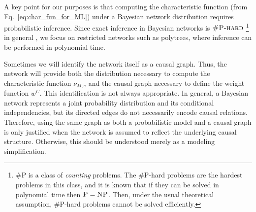 A key point for our purposes is that computing the characteristic function (from Eq.~\eqref{eq:char_fun_for_ML}) under a Bayesian network distribution requires probabilistic inference. Since exact inference in Bayesian networks is $\textsc{\#P-hard}$ \footnote{\#\textsc{P} is a class of \textit{counting} problems. The \#\textsc{P}-hard problems are the hardest problems in this class, and it is known that if they can be solved in polynomial time then $\textsc{P} = \textsc{NP}$. Then, under the usual theoretical assumption, \#\textsc{P}-hard problems cannot be solved efficiently.} in general \parencite{Cooper1990}, we focus on restricted networks such as polytrees, where inference can be performed in polynomial time.

Sometimes we will identify the network itself as a causal graph. Thus, the network will provide both the distribution necessary to compute the characteristic function $\nu_{M,e}$ and the causal graph necessary to define the weight function $w^C$.
This identification is not always appropriate. In general, a Bayesian network represents a joint probability distribution and its conditional independencies, but its directed edges do not necessarily encode causal relations. Therefore, using the same graph as both a probabilistic model and a causal graph is only justified when the network is assumed to reflect the underlying causal structure. Otherwise, this should be understood merely as a modeling simplification.
